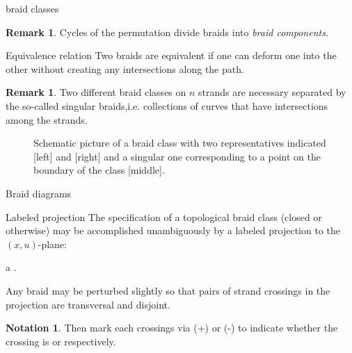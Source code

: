 \documentclass[9pt, english]{beamer}
\theoremstyle{definition}
\newtheorem{oss}[thm]{Remark}
\newtheorem{notation}[thm]{Notation}
\begin{document}
\begin{frame}{braid classes}
    \begin{oss}
        Cycles of the permutation divide braids into {\em braid
        components.\/}
    \end{oss}\pause
    \begin{block}{Equivalence relation}
        Two braids are equivalent if one can deform one into the other
        without creating any intersections along the path.\pause\\
        \color{green}{Thus a braid class is the equivalence class of isotopic
        braids.}
    \end{block}\pause
    \begin{oss}
        Two different braid classes on $n$ strands are necessary
        separated by the so-called \alert{singular braids},\pause i.e.
        collections of curves that {\color{red}{do}\/} have intersections
        among the strands.
    \end{oss}
\end{frame}
\begin{frame}
\begin{figure}\label{fig:singular}
        \caption{Schematic picture of a braid class with two representatives indicated
        [left] and [right] and a singular one corresponding to a point on the boundary of the class [middle].}
        \end{figure}
\end{frame}
\begin{frame}{Braid diagrams }
    \begin{block}{Labeled projection}\pause
        The specification of a topological braid class \pause (closed or
        otherwise) may be accomplished unambiguously by a labeled
        projection to the $(x,u)$-plane:

        a {\color{red}{ braid diagram}\/}.\pause

        Any braid may be perturbed slightly so that pairs of strand
        crossings in the projection are transversal and disjoint.\pause
    \end{block}
        \begin{notation}
        Then mark each crossings via (+) or (-) to indicate whether the
        crossing is {\color{red}{bottom over top}\/} or {\em \color{red}{top over bottom}\/}
        respectively.\pause

        {\color{green}{Since we are dealing with Legendrian braids all crossings have
        positive labels.}\/}
        \end{notation}
\end{frame}
\end{document}
